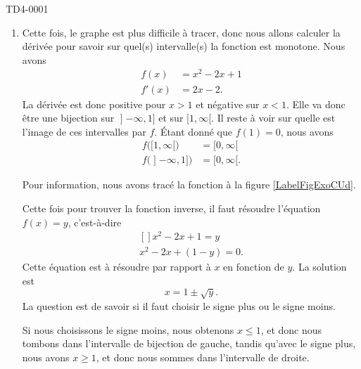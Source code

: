 \begin{corrige}{TD4-0001}
\begin{enumerate}
		\item
			Cette fois, le graphe est plus difficile à tracer, donc nous allons calculer la dérivée pour savoir sur quel(s) intervalle(s) la fonction est monotone. Nous avons
			\begin{subequations}
				\begin{align}
					f(x)&=x^2-2x+1\\
					f'(x)&=2x-2.
				\end{align}
			\end{subequations}
			La dérivée est donc positive pour $x>1$ et négative sur $x<1$. Elle va donc être une bijection sur $\mathopen] -\infty , 1 \mathclose]$ et sur $\mathopen[ 1 , \infty [$. Il reste à voir sur quelle est l'image de ces intervalles par $f$. Étant donné que $f(1)=0$, nous avons
			\begin{subequations}
				\begin{align}
					f\big( \mathopen[ 1 , \infty [ \big)&=\mathopen[ 0 , \infty [\\
					f\big( \mathopen] -\infty , 1 \mathclose] \big)&=\mathopen[ 0 , \infty [.
				\end{align}
			\end{subequations}
			
			Pour information, nous avons tracé la fonction à la figure \ref{LabelFigExoCUd}.
			\newcommand{\CaptionFigExoCUd}{La fonction de l'exerice \ref{exoTD4-0001}.\ref{ItemexoTD1ii}. Remarquer la symétrie autour du sommet, comme toute fonction du second degré. Pour un $y$ donné, il y a \emph{deux} $x$ sur lesquels fa fonction vaut $y$.}


			Cette fois pour trouver la fonction inverse, il faut résoudre l'équation $f(x)=y$, c'est-à-dire
			\begin{equation}
				\begin{aligned}[]
					x^2-2x+1=y\\
					x^2-2x+(1-y)=0.
				\end{aligned}
			\end{equation}
			Cette équation est à résoudre par rapport à $x$ en fonction de $y$. La solution est 
			\begin{equation}
				x=1\pm\sqrt{y}.
			\end{equation}
			La question est de savoir si il faut choisir le signe plus ou le signe moins.
			
			Si nous choisissons le signe moins, nous obtenons $x\leq 1$, et donc nous tombons dans l'intervalle de bijection de gauche, tandis qu'avec le signe plus, nous avons $x\geq 1$, et donc nous sommes dans l'intervalle de droite.


\end{enumerate}
\end{corrige}
